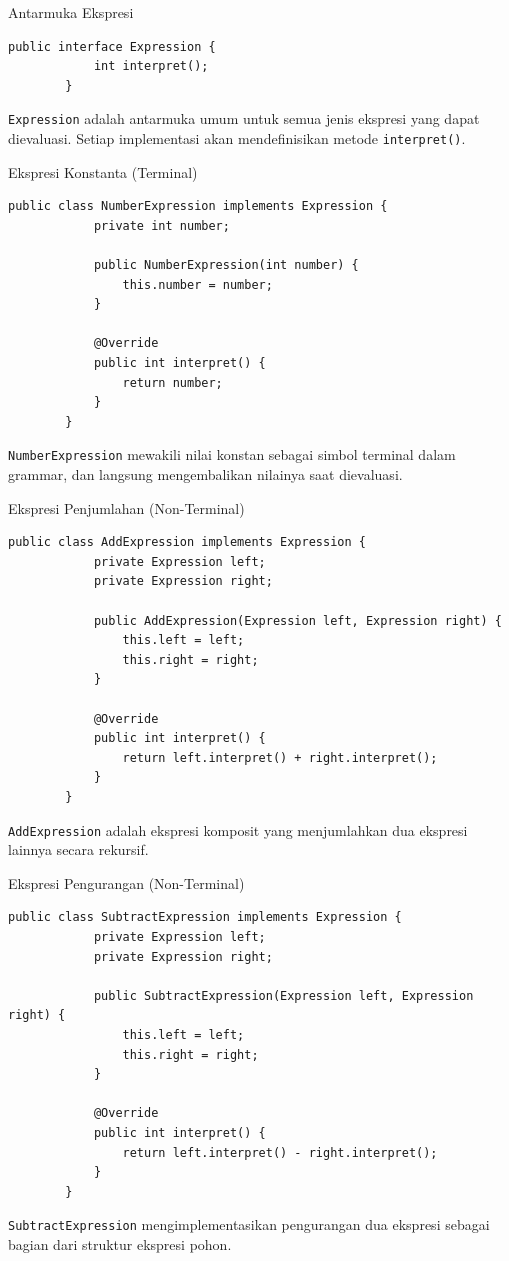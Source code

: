 \documentclass[aspectratio=169, table]{beamer}
\begin{document}
\begin{frame}[fragile]{Antarmuka Ekspresi}
	\begin{lstlisting}[style=JavaStyle]
		public interface Expression {
			int interpret();
		}
	\end{lstlisting}
	\small
	\texttt{Expression} adalah antarmuka umum untuk semua jenis ekspresi yang dapat dievaluasi. Setiap implementasi akan mendefinisikan metode \texttt{interpret()}.
\end{frame}

\begin{frame}[fragile]{Ekspresi Konstanta (Terminal)}
	\begin{lstlisting}[style=JavaStyle]
		public class NumberExpression implements Expression {
			private int number;
			
			public NumberExpression(int number) {
				this.number = number;
			}
			
			@Override
			public int interpret() {
				return number;
			}
		}
	\end{lstlisting}
	\small
	\texttt{NumberExpression} mewakili nilai konstan sebagai simbol terminal dalam grammar, dan langsung mengembalikan nilainya saat dievaluasi.
\end{frame}

\begin{frame}[fragile]{Ekspresi Penjumlahan (Non-Terminal)}
	\begin{lstlisting}[style=JavaStyle]
		public class AddExpression implements Expression {
			private Expression left;
			private Expression right;
			
			public AddExpression(Expression left, Expression right) {
				this.left = left;
				this.right = right;
			}
			
			@Override
			public int interpret() {
				return left.interpret() + right.interpret();
			}
		}
	\end{lstlisting}
	\small
	\texttt{AddExpression} adalah ekspresi komposit yang menjumlahkan dua ekspresi lainnya secara rekursif.
\end{frame}

\begin{frame}[fragile]{Ekspresi Pengurangan (Non-Terminal)}
	\begin{lstlisting}[style=JavaStyle]
		public class SubtractExpression implements Expression {
			private Expression left;
			private Expression right;
			
			public SubtractExpression(Expression left, Expression right) {
				this.left = left;
				this.right = right;
			}
			
			@Override
			public int interpret() {
				return left.interpret() - right.interpret();
			}
		}
	\end{lstlisting}
	\small
	\texttt{SubtractExpression} mengimplementasikan pengurangan dua ekspresi sebagai bagian dari struktur ekspresi pohon.
\end{frame}
\end{document}
